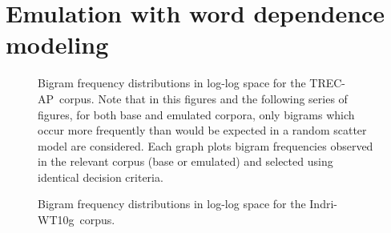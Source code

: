 \documentclass[11pt]{report}
\newcommand{\todo}[1]{{\color{blue}[[TODO: {\emph{#1}}]]}}
\newcommand{\TRECAP}{TREC-AP}
\newcommand{\IndriWT}{Indri-WT10g}
\newcommand{\PP}{Imagefiles}
\begin{document}


\chapter{Emulation with word dependence modeling}    %
\label{chap:dependenceExpts}


\begin{figure}[p]
  \centering


\caption{Bigram frequency distributions in log-log space for the
  \TRECAP~corpus. Note that in this figures and the following series of
  figures, for both base and emulated corpora, only bigrams which occur more frequently than
  would be expected in a random scatter model are considered.  Each graph plots bigram frequencies observed
  in the relevant corpus (base or emulated) and selected using identical decision
  criteria.   
\label{fitAP}}
\end{figure}

\begin{figure}[p]
\centering

\caption{Bigram frequency distributions in log-log space for the
  \IndriWT~corpus.
\label{fitWT}}
\end{figure}
\end{document}
